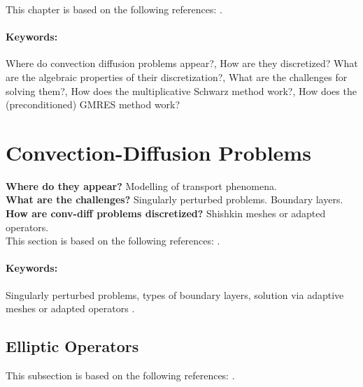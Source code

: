 \ifnum{}
\vspace{1.cm}
This chapter is based on the following references: \cite{BenFroNabSzy01, ChaMat94, DolJolNat15, EchLieSzyTic18, EchLieTic19, ElmSilWat14, FraLiuRooStyZho09, Gal13, Gan08, GolVan13, Gre97, GriDolSil15, Hac10, HorJoh12, KopOri10, LanRosSzy91, LieStr03, LieStr12, Lin10, MacOriShi00, MacOriShi02, MilOriShi96, Sch69, Saa03, Smi85, Sty05, TosWid05, Var09}.

\paragraph{Keywords:} Where do convection diffusion problems appear?, How are they discretized? What are the algebraic properties of their discretization?, What are the challenges for solving them?, How does the multiplicative Schwarz method work?, How does the (preconditioned) GMRES method work?


\section{Convection-Diffusion Problems}
\label{back:convdiff}

\noindent \textbf{Where do they appear?}
Modelling of transport phenomena.\\
\textbf{What are the challenges?}
Singularly perturbed problems. Boundary layers.\\
\textbf{How are conv-diff problems discretized?}
Shishkin meshes or adapted operators.\\

This section is based on the following references: \cite{EchLieSzyTic18, EchLieTic19, ElmSilWat14, GriDolSil15, Hac10, KopOri10, LanRosSzy91, LieStr03, Lin10, MilOriShi96, Saa03, Smi85, Sty05, Var09}.
\paragraph{Keywords:} Singularly perturbed problems, types of boundary layers, solution via adaptive meshes or adapted operators \cite{KopOri10, MilOriShi96}.


\subsection{Elliptic Operators}
\label{back:convdiff:elliptic}
This subsection is based on the following references: \cite{Hac10, KopOri10, LieStr03, MilOriShi96}.
